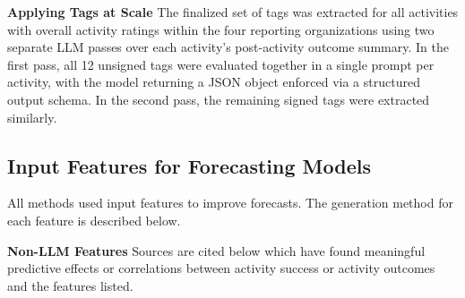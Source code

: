\documentclass[12pt,a4paper]{article}
\begin{document}
\textbf{Applying Tags at Scale}
The finalized set of tags was extracted for all activities with overall activity ratings within the four reporting organizations using two separate LLM passes over each activity's post-activity outcome summary. In the first pass, all 12 unsigned tags were evaluated together in a single prompt per activity, with the model returning a JSON object enforced via a structured output schema. In the second pass, the remaining signed tags were extracted similarly.

\subsection{Input Features for Forecasting Models}
All methods used input features to improve forecasts. The generation method for each feature is described below. 

\textbf{Non-LLM Features}
Sources are cited below which have found meaningful predictive effects or correlations between activity success or activity outcomes and the features listed.
\end{document}
